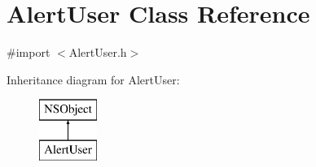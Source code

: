 \section{Alert\+User Class Reference}
\label{interface_alert_user}


{\ttfamily \#import $<$Alert\+User.\+h$>$}

Inheritance diagram for Alert\+User\+:\begin{figure}[H]
\begin{center}
\leavevmode
\includegraphics[height=2.000000cm]{interface_alert_user}
\end{center}
\end{figure}
